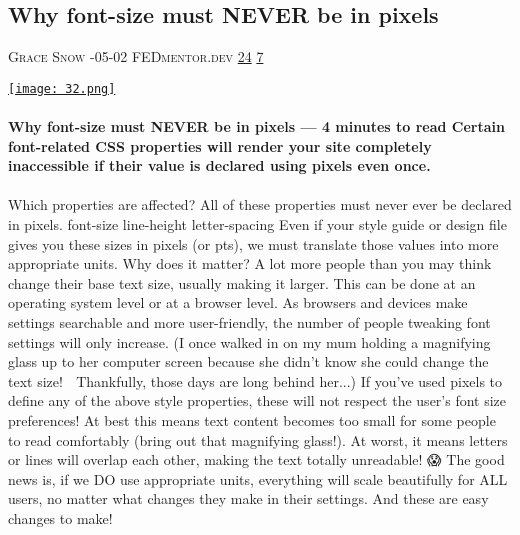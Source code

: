 \documentclass[10pt,a4paper]{article}
\begin{document}
\begin{multicols*}{2}
\begin{minipage}{\linewidth}
\subsection{Why font-size must NEVER be in pixels}
\textsc{\footnotesize
{\scriptsize\faUser}\space 
Grace Snow 
{\scriptsize\faCalendar}-05-02 
{\scriptsize\faGlobe}\space 
FEDmentor.dev 
{\scriptsize\faThumbsOUp}\space 
\href{http://news.ycombinator.com/item?id=37124019\&utm\_term=comment}{24} 
{\scriptsize\faComments}\space 
\href{http://news.ycombinator.com/item?id=37124019\&utm\_term=comment}{7} 
}
\par\medskip\noindent
\href{https://FEDmentor.dev/posts/font-size-px/?utm\_source=hackernewsletter\&utm\_medium=email\&utm\_term=design}{
    \texttt{[image: 32.png]}
}
\end{minipage}
\paragraph{}
\textbf{Why font-size must NEVER be in pixels
— 4 minutes to read
Certain font-related CSS properties will render your site completely inaccessible if their value is declared using pixels even once.}
\paragraph{}

Which properties are affected?
All of these properties must never ever be declared in pixels.
font-size
line-height
letter-spacing
Even if your style guide or design file gives you these sizes in pixels (or pts), we must translate those values into more appropriate units.
Why does it matter?
A lot more people than you may think change their base text size, usually making it larger. This can be done at an operating system level or at a browser level.
As browsers and devices make settings searchable and more user-friendly, the number of people tweaking font settings will only increase. (I once walked in on my mum holding a magnifying glass up to her computer screen because she didn't know she could change the text size! 🤭 Thankfully, those days are long behind her...)
If you've used pixels to define any of the above style properties, these will not respect the user's font size preferences!
At best this means text content becomes too small for some people to read comfortably (bring out that magnifying glass!). At worst, it means letters or lines will overlap each other, making the text totally unreadable! 😱
The good news is, if we DO use appropriate units, everything will scale beautifully for ALL users, no matter what changes they make in their settings. And these are easy changes to make!


\end{multicols*}
\end{document}
